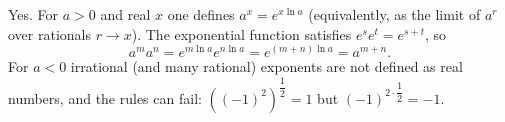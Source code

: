 Yes. For $a>0$ and real $x$ one defines $a^x=e^{x\ln a}$ (equivalently, as the limit of $a^{r}$ over rationals $r\to x$). The exponential function satisfies $e^{s}e^{t}=e^{s+t}$, so
\[a^m a^n=e^{m\ln a}e^{n\ln a}=e^{(m+n)\ln a}=a^{m+n}.\]
For $a<0$ irrational (and many rational) exponents are not defined as real numbers, and the rules can fail: $\left((-1)^2\right)^{\dfrac12}=1$ but $(-1)^{2\cdot\dfrac12}=-1$.
